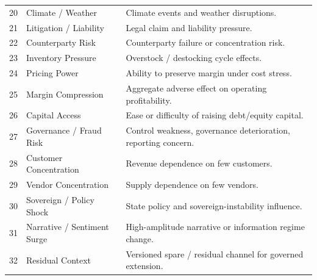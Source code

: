 \documentclass[11pt]{report}
\begin{document}
\begin{longtable}{p{}p{}p{}}
20 & Climate / Weather & Climate events and weather disruptions. \\
21 & Litigation / Liability & Legal claim and liability pressure. \\
22 & Counterparty Risk & Counterparty failure or concentration risk. \\
23 & Inventory Pressure & Overstock / destocking cycle effects. \\
24 & Pricing Power & Ability to preserve margin under cost stress. \\
25 & Margin Compression & Aggregate adverse effect on operating profitability. \\
26 & Capital Access & Ease or difficulty of raising debt/equity capital. \\
27 & Governance / Fraud Risk & Control weakness, governance deterioration, reporting concern. \\
28 & Customer Concentration & Revenue dependence on few customers. \\
29 & Vendor Concentration & Supply dependence on few vendors. \\
30 & Sovereign / Policy Shock & State policy and sovereign-instability influence. \\
31 & Narrative / Sentiment Surge & High-amplitude narrative or information regime change. \\
32 & Residual Context & Versioned spare / residual channel for governed extension. \\
\bottomrule
\end{longtable}
\end{document}
